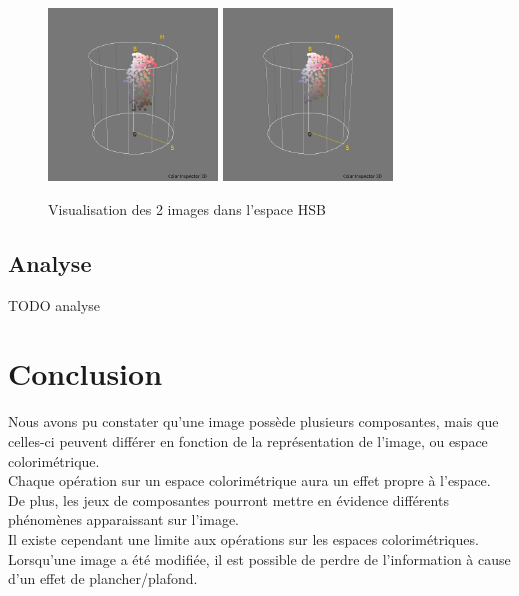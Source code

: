 \documentclass[a4paper]{article}
\begin{document}
\begin{figure}[H]
\begin{center}
\includegraphics[width=170px]{../resultats/e5_visu_original.png}
\includegraphics[width=170px]{../resultats/e5_visu_modif.png}
\end{center}
\caption{Visualisation des 2 images dans l'espace HSB}
\end{figure}

\clearpage
\subsection{Analyse}

TODO analyse

\clearpage


\section{Conclusion}
Nous avons pu constater qu'une image possède plusieurs composantes, mais que celles-ci peuvent différer en fonction de la représentation de l'image, ou espace colorimétrique.\\

Chaque opération sur un espace colorimétrique aura un effet propre à l'espace. De plus, les jeux de composantes pourront mettre en évidence différents phénomènes apparaissant sur l'image.\\
Il existe cependant une limite aux opérations sur les espaces colorimétriques. Lorsqu'une image a été modifiée, il est possible de perdre de l'information à cause d'un effet de plancher/plafond.\\
\end{document}
